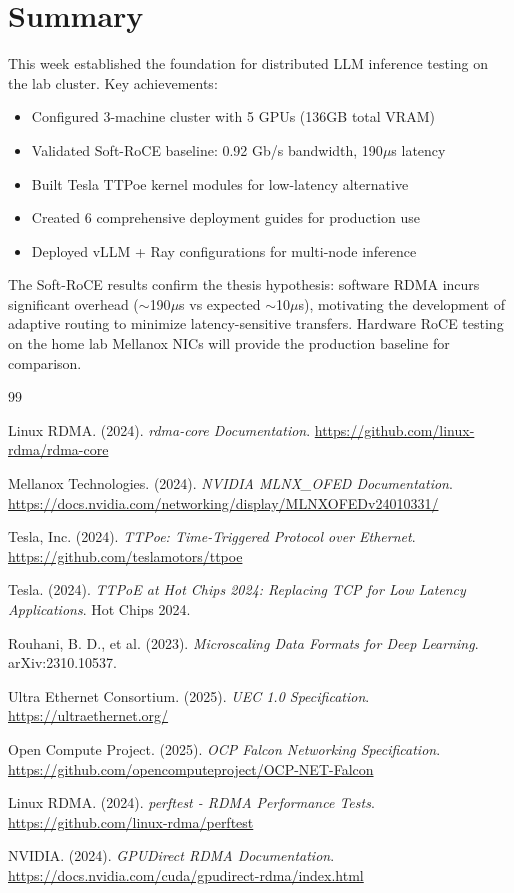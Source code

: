 \documentclass[10pt,letterpaper]{article}
\begin{document}
\section{Summary}

This week established the foundation for distributed LLM inference testing on the lab cluster. Key achievements:

\begin{itemize}[noitemsep]
    \item Configured 3-machine cluster with 5 GPUs (136GB total VRAM)
    \item Validated Soft-RoCE baseline: 0.92 Gb/s bandwidth, 190$\mu$s latency
    \item Built Tesla TTPoe kernel modules for low-latency alternative
    \item Created 6 comprehensive deployment guides for production use
    \item Deployed vLLM + Ray configurations for multi-node inference
\end{itemize}

The Soft-RoCE results confirm the thesis hypothesis: software RDMA incurs significant overhead ($\sim$190$\mu$s vs expected $\sim$10$\mu$s), motivating the development of adaptive routing to minimize latency-sensitive transfers. Hardware RoCE testing on the home lab Mellanox NICs will provide the production baseline for comparison.

\begin{thebibliography}{99}

Linux RDMA. (2024). \textit{rdma-core Documentation}. \url{https://github.com/linux-rdma/rdma-core}

Mellanox Technologies. (2024). \textit{NVIDIA MLNX\_OFED Documentation}. \url{https://docs.nvidia.com/networking/display/MLNXOFEDv24010331/}

Tesla, Inc. (2024). \textit{TTPoe: Time-Triggered Protocol over Ethernet}. \url{https://github.com/teslamotors/ttpoe}

Tesla. (2024). \textit{TTPoE at Hot Chips 2024: Replacing TCP for Low Latency Applications}. Hot Chips 2024.

Rouhani, B. D., et al. (2023). \textit{Microscaling Data Formats for Deep Learning}. arXiv:2310.10537.

Ultra Ethernet Consortium. (2025). \textit{UEC 1.0 Specification}. \url{https://ultraethernet.org/}

Open Compute Project. (2025). \textit{OCP Falcon Networking Specification}. \url{https://github.com/opencomputeproject/OCP-NET-Falcon}

Linux RDMA. (2024). \textit{perftest - RDMA Performance Tests}. \url{https://github.com/linux-rdma/perftest}

NVIDIA. (2024). \textit{GPUDirect RDMA Documentation}. \url{https://docs.nvidia.com/cuda/gpudirect-rdma/index.html}

\end{thebibliography}
\end{document}
